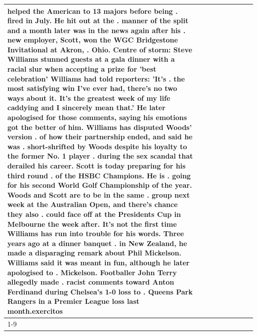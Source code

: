 \begin{table}[H]
\begin{tabular}{lllrlllll}
helped the American to 13 majors before being . fired in July. He hit out at the . manner of the split and a month later was in the news again after his . new employer, Scott, won the WGC Bridgestone Invitational at Akron, . Ohio. Centre of storm: Steve Williams stunned guests at a gala dinner with a racial slur when accepting a prize for 'best celebration' Williams had told reporters: 'It's . the most satisfying win I've ever had, there's no two ways about it. It's the greatest week of my life caddying and I sincerely mean that.' He later apologised for those comments, saying his emotions got the better of him. Williams has disputed Woods' version . of how their partnership ended, and said he was . short-shrifted by Woods despite his loyalty to the former No. 1 player . during the sex scandal that derailed his career. Scott is today preparing for his third round . of the HSBC Champions. He is . going for his second World Golf Championship of the year. Woods and Scott are to be in the same . group next week at the Australian Open, and there's chance they also . could face off at the Presidents Cup in Melbourne the week after. It's not the first time Williams has run into trouble for his words. Three years ago at a dinner banquet . in New Zealand, he made a disparaging remark about Phil Mickelson. Williams said it was meant in fun, although he later apologised to . Mickelson. Footballer John Terry allegedly made . racist comments toward Anton Ferdinand during Chelsea's 1-0 loss to . Queens Park Rangers in a Premier League loss last month.exercitos \\
\cline{1-9}

\end{tabular}
\end{table}
